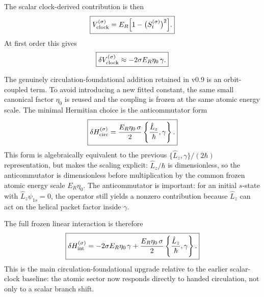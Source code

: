 \documentclass[11pt,a4paper]{article}
\begin{document}
The scalar clock-derived contribution is then
\begin{equation}
\label{eq:Vclock}
\boxed{
V_{\rm clock}^{(\sigma)}
=
E_R\Bigl[1-\bigl(S_t^{(\sigma)}\bigr)^2\Bigr].
}
\end{equation}
At first order this gives
\begin{equation}
\label{eq:Vclock-linear}
\boxed{
\delta V_{\rm clock}^{(\sigma)}
\approx
-2\sigma E_R\eta_0\,\gamma.
}
\end{equation}

The genuinely circulation-foundational addition retained in v0.9 is an orbit-coupled term. To avoid introducing a new fitted constant, the same small canonical factor $\eta_0$ is reused and the coupling is frozen at the same atomic energy scale. The minimal Hermitian choice is the anticommutator form
\begin{equation}
\label{eq:HintCirc}
\boxed{
\delta H_{\rm circ}^{(\sigma)}
=
\frac{E_R\eta_0\,\sigma}{2}
\left\{\frac{\hat L_z}{\hbar},\gamma\right\}.
}
\end{equation}
This form is algebraically equivalent to the previous $\{\hat L_z,\gamma\}/(2\hbar)$ representation, but makes the scaling explicit: $\hat L_z/\hbar$ is dimensionless, so the anticommutator is dimensionless before multiplication by the common frozen atomic energy scale $E_R\eta_0$. The anticommutator is important: for an initial $s$-state with $\hat L_z\psi_{1s}=0$, the operator still yields a nonzero contribution because $\hat L_z$ can act on the helical packet factor inside $\gamma$.

The full frozen linear interaction is therefore
\begin{equation}
\label{eq:HintTotal}
\boxed{
\delta H_{\rm int}^{(\sigma)}
=
-2\sigma E_R\eta_0\,\gamma
+
\frac{E_R\eta_0\,\sigma}{2}
\left\{\frac{\hat L_z}{\hbar},\gamma\right\}.
}
\end{equation}
This is the main circulation-foundational upgrade relative to the earlier scalar-clock baseline: the atomic sector now responds directly to handed circulation, not only to a scalar branch shift.
\end{document}
